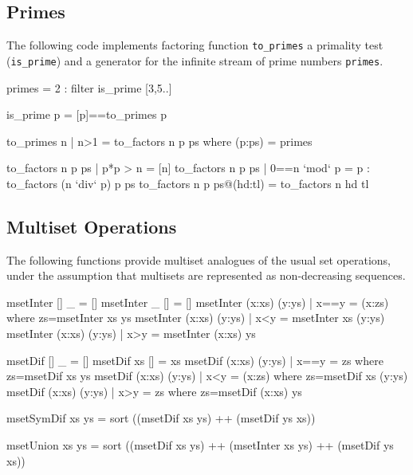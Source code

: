 \documentclass[]{INCLUDES/llncs}
\begin{document}



 

\subsection*{Primes}
The following code implements factoring function {\tt to\_primes} a primality
test ({\tt is\_prime}) and a generator for the infinite stream of prime numbers
{\tt primes}.

\begin{code}
primes = 2 : filter is_prime [3,5..]

is_prime p = [p]==to_primes p

to_primes n | n>1 = to_factors n p ps where 
  (p:ps) = primes

to_factors n p ps | p*p > n = [n]
to_factors n p ps | 0==n `mod` p = p : to_factors (n `div` p)  p ps 
to_factors n p ps@(hd:tl) = to_factors n hd tl
\end{code}

\subsection*{Multiset Operations}
The following functions provide multiset analogues of the usual set operations,
under the assumption that multisets are represented as non-decreasing sequences.
\begin{code}
msetInter [] _ = []
msetInter _ [] = []
msetInter (x:xs) (y:ys) | x==y = (x:zs) where zs=msetInter xs ys
msetInter (x:xs) (y:ys) | x<y = msetInter xs (y:ys)
msetInter (x:xs) (y:ys) | x>y = msetInter (x:xs) ys

msetDif [] _ = []
msetDif xs [] = xs
msetDif (x:xs) (y:ys) | x==y = zs where zs=msetDif xs ys
msetDif (x:xs) (y:ys) | x<y = (x:zs) where zs=msetDif xs (y:ys)
msetDif (x:xs) (y:ys) | x>y = zs where zs=msetDif (x:xs) ys

msetSymDif xs ys = sort ((msetDif xs ys) ++ (msetDif ys xs))

msetUnion xs ys = sort ((msetDif xs ys) ++ (msetInter xs ys) ++ (msetDif ys xs))
\end{code}
\end{document}

